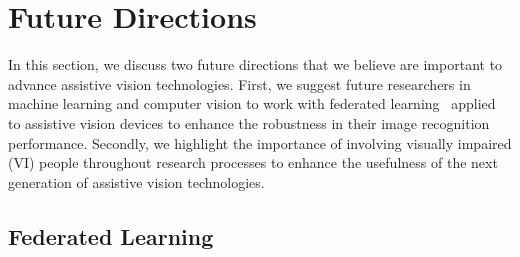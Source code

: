 


\section{Future Directions}\label{chap5:sec:future_directions}

In this section, we discuss two future directions that we believe are important to advance assistive vision technologies. First, we suggest future researchers in machine learning and computer vision to work with federated learning~\cite{li2020federated} applied to assistive vision devices to enhance the robustness in their image recognition performance. Secondly, we highlight the importance of involving visually impaired (VI) people throughout research processes to enhance the usefulness of the next generation of assistive vision technologies.  


\subsection{Federated Learning}

